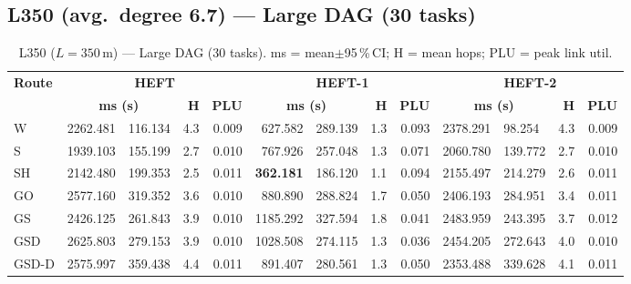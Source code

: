 \documentclass[11pt]{article}
\newcommand{\win}[1]{\textcolor{green!50!black}{\textbf{#1}}}
\newcommand{\bad}[1]{\textcolor{red!70!black}{#1}}
\begin{document}
\subsection{L350 (avg.\ degree 6.7) --- Large DAG (30 tasks)}
\begin{table}[H]\centering\small
\begin{tabular}{l r@{$\pm$}l r r r@{$\pm$}l r r r@{$\pm$}l r r}
\toprule
\textbf{Route} & \multicolumn{4}{c}{\textbf{HEFT}} & \multicolumn{4}{c}{\textbf{HEFT-1}} & \multicolumn{4}{c}{\textbf{HEFT-2}} \\
\cmidrule(lr){2-5}\cmidrule(lr){6-9}\cmidrule(lr){10-13}
& \multicolumn{2}{c}{\textbf{ms (s)}} & \textbf{H} & \textbf{PLU}& \multicolumn{2}{c}{\textbf{ms (s)}} & \textbf{H} & \textbf{PLU}& \multicolumn{2}{c}{\textbf{ms (s)}} & \textbf{H} & \textbf{PLU} \\
\midrule
  W & 2262.481 & 116.134 & 4.3 & 0.009 & 627.582 & 289.139 & 1.3 & 0.093 & 2378.291 & 98.254 & 4.3 & 0.009 \\
  S & 1939.103 & 155.199 & 2.7 & 0.010 & 767.926 & 257.048 & 1.3 & 0.071 & 2060.780 & 139.772 & 2.7 & 0.010 \\
  SH & 2142.480 & 199.353 & 2.5 & 0.011 & \win{362.181} & 186.120 & 1.1 & 0.094 & 2155.497 & 214.279 & 2.6 & 0.011 \\
  GO & 2577.160 & 319.352 & 3.6 & 0.010 & 880.890 & 288.824 & 1.7 & 0.050 & 2406.193 & 284.951 & 3.4 & 0.011 \\
  GS & 2426.125 & 261.843 & 3.9 & 0.010 & \bad{1185.292} & 327.594 & 1.8 & 0.041 & \bad{2483.959} & 243.395 & 3.7 & 0.012 \\
  GSD & \bad{2625.803} & 279.153 & 3.9 & 0.010 & 1028.508 & 274.115 & 1.3 & 0.036 & 2454.205 & 272.643 & 4.0 & 0.010 \\
  GSD-D & 2575.997 & 359.438 & 4.4 & 0.011 & 891.407 & 280.561 & 1.3 & 0.050 & 2353.488 & 339.628 & 4.1 & 0.011 \\
\bottomrule\end{tabular}
\caption{L350 ($L=350$\,m) --- Large DAG (30 tasks). ms = mean$\pm$95\,\%\,CI; H = mean hops; PLU = peak link util.}
\end{table}
\end{document}

